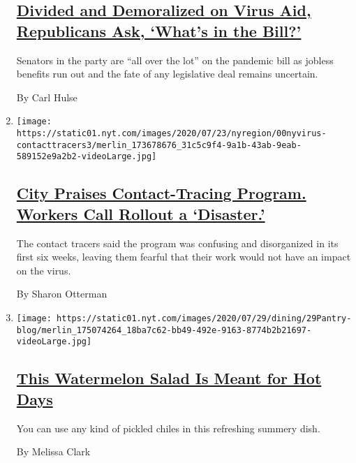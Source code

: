 \begin{enumerate}
{  \subsection{\texorpdfstring{\href{/2020/07/29/us/politics/republicans-congress-virus-aid.html}{Divided
  and Demoralized on Virus Aid, Republicans Ask, `What's in the
  Bill?'}}{Divided and Demoralized on Virus Aid, Republicans Ask, `What's in the Bill?'}}\label{divided-and-demoralized-on-virus-aid-republicans-ask-whats-in-the-bill}}

  Senators in the party are ``all over the lot'' on the pandemic bill as
  jobless benefits run out and the fate of any legislative deal remains
  uncertain.

  By Carl Hulse
\item
  \texttt{[image: https://static01.nyt.com/images/2020/07/23/nyregion/00nyvirus-contacttracers3/merlin\_173678676\_31c5c9f4-9a1b-43ab-9eab-589152e9a2b2-videoLarge.jpg]}

  \hypertarget{city-praises-contact-tracing-program-workers-call-rollout-a-disaster}{%
  \subsection{\texorpdfstring{\href{/2020/07/29/nyregion/new-york-contact-tracing.html}{City
  Praises Contact-Tracing Program. Workers Call Rollout a
  `Disaster.'}}{City Praises Contact-Tracing Program. Workers Call Rollout a `Disaster.'}}\label{city-praises-contact-tracing-program-workers-call-rollout-a-disaster}}

  The contact tracers said the program was confusing and disorganized in
  its first six weeks, leaving them fearful that their work would not
  have an impact on the virus.

  By Sharon Otterman
\item
  \texttt{[image: https://static01.nyt.com/images/2020/07/29/dining/29Pantry-blog/merlin\_175074264\_18ba7c62-bb49-492e-9163-8774b2b21697-videoLarge.jpg]}

  \hypertarget{this-watermelon-salad-is-meant-for-hot-days}{%
  \subsection{\texorpdfstring{\href{/2020/07/29/dining/watermelon-salad-recipe.html}{This
  Watermelon Salad Is Meant for Hot
  Days}}{This Watermelon Salad Is Meant for Hot Days}}\label{this-watermelon-salad-is-meant-for-hot-days}}

  You can use any kind of pickled chiles in this refreshing summery
  dish.

  By Melissa Clark
\end{enumerate}

